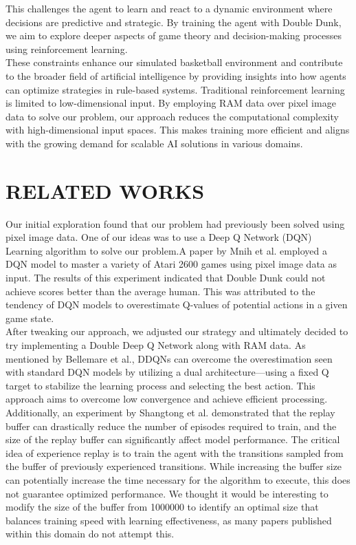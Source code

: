 \documentclass[letterpaper, 10 pt, conference]{ieeeconf}
\begin{document}
This challenges the agent to learn and react to a dynamic environment where decisions are predictive and strategic. By training the agent with Double Dunk, we aim to explore deeper aspects of game theory and decision-making processes using reinforcement learning.\\

These constraints enhance our simulated basketball environment and contribute to the broader field of artificial intelligence by providing insights into how agents can optimize strategies in rule-based systems. Traditional reinforcement learning is limited to low-dimensional input. By employing RAM data over pixel image data to solve our problem, our approach reduces the computational complexity with high-dimensional input spaces. This makes training more efficient and aligns with the growing demand for scalable AI solutions in various domains. \\

\section{\textbf{RELATED WORKS}}
\vspace{.5cm}
Our initial exploration found that our problem had previously been solved using pixel image data. One of our ideas was to use a Deep Q Network (DQN) Learning algorithm to solve our problem.A paper by Mnih et al. employed a DQN model to master a variety of Atari 2600 games using pixel image data as input.  The results of this experiment indicated that Double Dunk could not achieve scores better than the average human. This was attributed to the tendency of DQN models to overestimate Q-values of potential actions in a given game state. \\

After tweaking our approach, we adjusted our strategy and ultimately decided to try implementing a Double Deep Q Network along with RAM data. As mentioned by Bellemare et al., DDQNs can overcome the overestimation seen with standard DQN models by utilizing a dual architecture—using a fixed Q target to stabilize the learning process and selecting the best action. This approach aims to overcome low convergence and achieve efficient processing. \\

Additionally, an experiment by Shangtong et al. demonstrated that the replay buffer can drastically reduce the number of episodes required to train, and the size of the replay buffer can significantly affect model performance. The critical idea of experience replay is to train the agent with the transitions sampled from the buffer of previously experienced transitions. While increasing the buffer size can potentially increase the time necessary for the algorithm to execute, this does not guarantee optimized performance. We thought it would be interesting to modify the size of the buffer from 1000000 to identify an optimal size that balances training speed with learning effectiveness, as many papers published within this domain do not attempt this.\\
\end{document}
